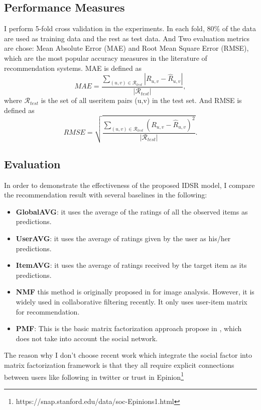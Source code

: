 \subsection{Performance Measures}
I perform 5-fold cross validation in the experiments. In each fold, 80\% of the data are used as training data and the rest as test data. And Two evaluation metrics are chose: Mean Absolute Error (MAE) and Root Mean Square Error (RMSE), which are the most popular accuracy measures in the literature of recommendation systems.
MAE is defined as
\begin{equation}
MAE = \frac{\sum_{(u,v) \in \mathcal{R}_{test}}{|R_{u,v} - \hat{R}_{u,v}|}}{|\mathcal{R}_{test}|},
\end{equation} 
where $\mathcal{R}_{test}$ is the set of all user\-item pairs (u,v) in the test set. And RMSE is defined as
\begin{equation}
RMSE = \sqrt{\frac{\sum_{(u,v) \in \mathcal{R}_{test}}{(R_{u,v} - \hat{R}_{u,v})^2}}{|\mathcal{R}_{test}|}}.
\end{equation}
\subsection{Evaluation}
In order to demonstrate the effectiveness of the proposed IDSR model, I compare the recommendation result with several baselines in the following:
\begin{itemize}
	\item \textbf{GlobalAVG}: it uses the average of the ratings of all the observed items as predictions.
	\item \textbf{UserAVG}: it uses the average of ratings given by the user as his/her predictions.
	\item \textbf{ItemAVG}: it uses the average of ratings received by the target item as its predictions.
	\item \textbf{NMF} this method is originally proposed in \cite{lee1999learning} for image analysis. However, it is widely used in collaborative filtering recently. It only uses user-item matrix for recommendation.
	\item \textbf{PMF}: This is the basic matrix factorization approach propose in \cite{mnih2007probabilistic} , which does not take into account the social network.
\end{itemize}

The reason why I don't choose recent work which integrate the social factor into matrix factorization framework \cite{jamali2010matrix}\cite{ma2008sorec}\cite{ma2009learningTrust}\cite{yang2012circle}\cite{yang2013social} is that they all require explicit connections between users like following in twitter or trust in Epinion\footnote{https://snap.stanford.edu/data/soc-Epinions1.html}

